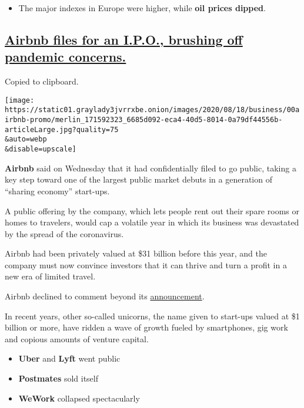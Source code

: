 \begin{itemize}
\tightlist
\item
  The major indexes in Europe were higher, while \textbf{oil prices
  dipped}.
\end{itemize}

\hypertarget{airbnb-files-for-an-ipo-brushing-off-pandemic-concerns}{%
\subsection{\texorpdfstring{\protect\hyperlink{airbnb-files-for-an-ipo-brushing-off-pandemic-concerns}{Airbnb
files for an I.P.O., brushing off pandemic
concerns.}}{Airbnb files for an I.P.O., brushing off pandemic concerns.}}\label{airbnb-files-for-an-ipo-brushing-off-pandemic-concerns}}

Copied to clipboard.

\texttt{[image: https://static01.graylady3jvrrxbe.onion/images/2020/08/18/business/00airbnb-promo/merlin\_171592323\_6685d092-eca4-40d5-8014-0a79df44556b-articleLarge.jpg?quality=75\\\&auto=webp\\\&disable=upscale]}

\textbf{Airbnb} said on Wednesday that it had confidentially filed to go
public, taking a key step toward one of the largest public market debuts
in a generation of ``sharing economy'' start-ups.

A public offering by the company, which lets people rent out their spare
rooms or homes to travelers, would cap a volatile year in which its
business was devastated by the spread of the coronavirus.

Airbnb had been privately valued at \$31 billion before this year, and
the company must now convince investors that it can thrive and turn a
profit in a new era of limited travel.

Airbnb declined to comment beyond its
\href{https://news.airbnb.com/airbnb-announces-confidential-submission-of-draft-registration-statement/}{announcement}.

In recent years, other so-called unicorns, the name given to start-ups
valued at \$1 billion or more, have ridden a wave of growth fueled by
smartphones, gig work and copious amounts of venture capital.

\begin{itemize}
\item
  \textbf{Uber} and \textbf{Lyft} went public
\item
  \textbf{Postmates} sold itself
\item
  \textbf{WeWork} collapsed spectacularly
\end{itemize}


